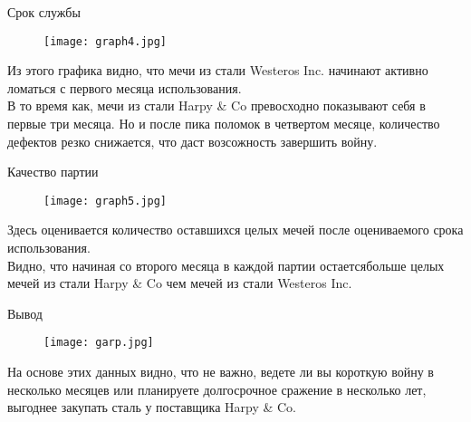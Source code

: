 \documentclass{beamer}
\begin{document}
    \begin{frame}{Срок службы}
        \begin{figure}
            \centering
            \texttt{[image: graph4.jpg]}
        \end{figure}
        Из этого графика видно, что мечи из стали Westeros Inc. начинают активно ломаться с первого месяца использования. \\
        В то время как, мечи из стали Harpy \& Co превосходно показывают себя в первые три месяца. Но и после пика поломок в четвертом месяце, количество дефектов резко снижается, что даст возсожность завершить войну.
    \end{frame}
    
    \begin{frame}{Качество партии}
        \begin{figure}
            \centering
            \texttt{[image: graph5.jpg]}
        \end{figure}
        Здесь оценивается количество оставшихся целых мечей после оцениваемого срока использования.\\
        Видно, что начиная со второго месяца в каждой партии остаетсябольше целых мечей из стали Harpy \& Co чем мечей из стали Westeros Inc.
    \end{frame}
    
    \begin{frame}{Вывод}
        \begin{figure}
            \centering
            \texttt{[image: garp.jpg]}
        \end{figure}
        На основе этих данных видно, что не важно, ведете ли вы короткую войну в несколько месяцев или планируете долгосрочное сражение в несколько лет, выгоднее закупать сталь у поставщика Harpy \& Co.
    \end{frame}
\end{document}
